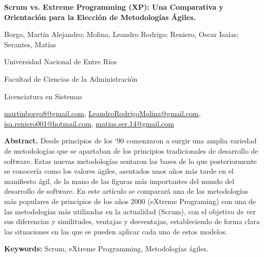 \documentclass[a4paper,10pt]{article}
\begin{document}
	\pagestyle{empty}
	\begin{titlepage}
		\centering
		\vspace*{1.5cm}
		{\fontsize{14}{17}\bfseries Scrum vs. Extreme Programming (XP): Una Comparativa y Orientación para la Elección de Metodologías Ágiles.\par}
		{\small Borgo, Martín Alejandro; Molina, Leandro Rodrigo; Reniero, Oscar Isaías; Serantes, Matías\par}
		{\normalsize Universidad Nacional de Entre Ríos\par}
		{\normalsize Facultad de Ciencias de la Administración\par}
		{\normalsize Licenciatura en Sistemas\par}
		{\small \href{mailto:martinborgo8@gmail.com}{martinborgo8@gmail.com},
		\href{mailto:LeandroRodrigoMolina@gmail.com}{LeandroRodrigoMolina@gmail.com}, \href{mailto:isa.reniero001@hotmail.com}{isa.reniero001@hotmail.com},
		\href{mailto:matias.ser.14@gmail.com}{matias.ser.14@gmail.com}
		\par}
		{\small \justify\textbf{Abstract.} Desde principios de los ‘90 comenzaron a surgir una amplia variedad de metodologías que se apartaban de los principios tradicionales de desarrollo de software. Estas nuevas metodologías sentaron las bases de lo que posteriormente se conocería como los valores ágiles, asentados unos años más tarde en el manifiesto ágil, de la mano de las figuras más importantes del mundo del desarrollo de software. En este artículo se comparará una de las metodologías más populares de principios de los años 2000 (eXtreme Programing) con una de las metodologías más utilizadas en la actualidad (Scrum), con el objetivo de ver sus diferencias y similitudes, ventajas y desventajas, estableciendo de forma clara las situaciones en las que se pueden aplicar cada uno de estos modelos.\par}
		
		{\small \justify\textbf{Keywords:} Scrum, eXtreme Programming, Metodologías ágiles. \par}
	\end{titlepage}
	
\end{document}
